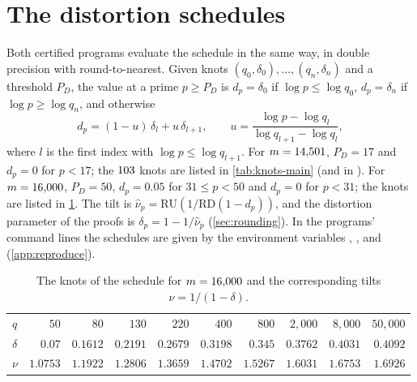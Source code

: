 \section{The distortion schedules}\label{app:schedule}

Both certified programs evaluate the schedule in the same way, in double precision with round-to-nearest. Given
knots $(q_0,\delta_0),\dots,(q_n,\delta_n)$ and a threshold $P_D$, the value at a prime $p\ge P_D$ is $d_p=\delta_0$
if $\log p\le\log q_0$, $d_p=\delta_n$ if $\log p\ge\log q_n$, and otherwise
\[
  d_p=(1-u)\,\delta_l+u\,\delta_{l+1},\qquad u=\frac{\log p-\log q_l}{\log q_{l+1}-\log q_l},
\]
where $l$ is the first index with $\log p\le\log q_{l+1}$. For $m=\Mzero$, $P_D=17$ and $d_p=0$ for $p<17$; the
$\nKnotsMain$ knots are listed in \cref{tab:knots-main} (and in ). For $m=16{,}000$, $P_D=50$, $d_p=0.05$ for $31\le p<50$ and
$d_p=0$ for $p<31$; the knots are listed in \cref{tab:knots}. The tilt is $\hat\nu_p=\mathrm{RU}(1/\mathrm{RD}(1-d_p))$,
and the distortion parameter of the proofs is $\delta_p=1-1/\hat\nu_p$ (\cref{sec:rounding}). In the programs' command
lines the schedules are given by the environment variables , ,  and 
(\cref{app:reproduce}).

\begin{table}[ht]
\centering
\caption{The $\nKnotsMain$ knots $(q,\delta)$ of the schedule for $m=\Mzero$.}
\label{tab:knots-main}
\footnotesize

\end{table}

\begin{table}[ht]
\centering
\caption{The knots of the schedule for $m=16{,}000$ and the corresponding tilts $\nu=1/(1-\delta)$.}
\label{tab:knots}
\small
\begin{tabular}{@{}lrrrrrrrrr@{}}
\toprule
$q$ & $50$ & $80$ & $130$ & $220$ & $400$ & $800$ & $2{,}000$ & $8{,}000$ & $50{,}000$\\
$\delta$ & $0.07$ & $0.1612$ & $0.2191$ & $0.2679$ & $0.3198$ & $0.345$ & $0.3762$ & $0.4031$ & $0.4092$\\
$\nu$ & $1.0753$ & $1.1922$ & $1.2806$ & $1.3659$ & $1.4702$ & $1.5267$ & $1.6031$ & $1.6753$ & $1.6926$\\
\bottomrule
\end{tabular}
\end{table}

